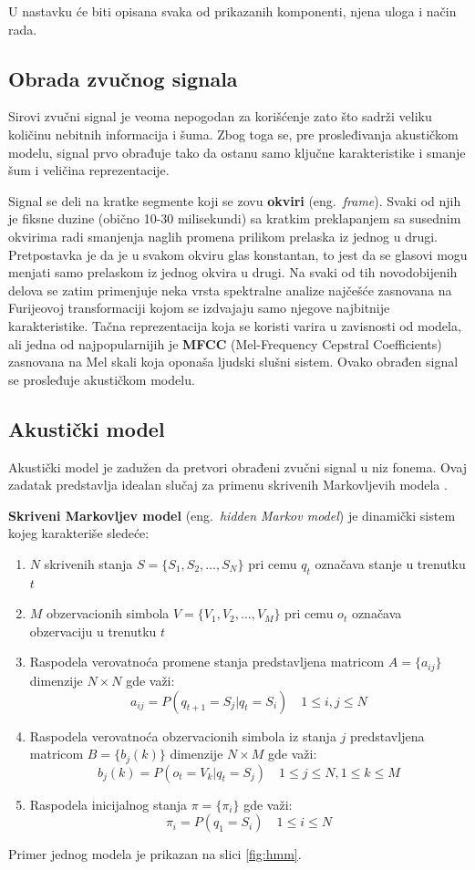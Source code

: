 \documentclass[a4paper]{article}
\begin{document}
U nastavku će biti opisana svaka od prikazanih komponenti, njena uloga i način rada.

\subsection{Obrada zvučnog signala}
\label{sec:obrada}
Sirovi zvučni signal je veoma nepogodan za korišćenje zato što sadrži veliku količinu nebitnih informacija i šuma.
Zbog toga se, pre prosleđivanja akustičkom modelu, signal prvo obrađuje tako da ostanu samo ključne karakteristike i smanje šum i veličina reprezentacije.

Signal se deli na kratke segmente koji se zovu \textbf{okviri} (eng.~{\em frame}).
Svaki od njih je fiksne duzine (obično 10-30 milisekundi) sa kratkim preklapanjem sa susednim okvirima radi smanjenja naglih promena prilikom prelaska iz jednog u drugi.
Pretpostavka je da je u svakom okviru glas konstantan, to jest da se glasovi mogu menjati samo prelaskom iz jednog okvira u drugi.
Na svaki od tih novodobijenih delova se zatim primenjuje neka vrsta spektralne analize najčešće zasnovana na Furijeovoj transformaciji kojom se izdvajaju samo njegove najbitnije karakteristike.
Tačna reprezentacija koja se koristi varira u zavisnosti od modela, ali jedna od najpopularnijih je \textbf{MFCC} (Mel-Frequency Cepstral Coefficients) \cite{dave2013feature} zasnovana na Mel skali koja oponaša ljudski slušni sistem.
Ovako obrađen signal se prosleđuje akustičkom modelu.

\subsection{Akustički model}
Akustički model je zadužen da pretvori obrađeni zvučni signal u niz fonema. 
Ovaj zadatak predstavlja idealan slučaj za primenu skrivenih Markovljevih modela \cite{rabiner1989hmm}.

\textbf{Skriveni Markovljev model} (eng.~{\em hidden Markov model}) je dinamički sistem kojeg karakteriše sledeće:
\begin{enumerate}
  \item $N$ skrivenih stanja $S = \{S_1, S_2, \dots, S_N\}$ pri cemu $q_t$ označava stanje u trenutku $t$
  \item $M$ obzervacionih simbola $V = \{V_1, V_2, \dots, V_M\}$ pri cemu $o_t$ označava obzervaciju u trenutku $t$
  \item Raspodela verovatnoća promene stanja predstavljena matricom $A=\{a_{ij}\}$ dimenzije $N \times N$ gde važi: $$a_{ij} = P(q_{t+1} = S_j | q_{t} = S_i) \quad 1 \leq i,j \leq N$$
  \item Raspodela verovatnoća obzervacionih simbola iz stanja $j$ predstavljena matricom $B=\{b_j(k)\}$ dimenzije $N \times M$ gde važi: $$b_j(k) = P(o_t = V_k | q_t = S_j) \quad 1 \leq j \leq N, 1 \leq k \leq M$$
  \item Raspodela inicijalnog stanja $\pi=\{\pi_i\}$ gde važi: $$\pi_i = P(q_1 = S_i) \quad 1 \leq i \leq N$$
\end{enumerate}
Primer jednog modela je prikazan na slici \ref{fig:hmm}.
\end{document}
